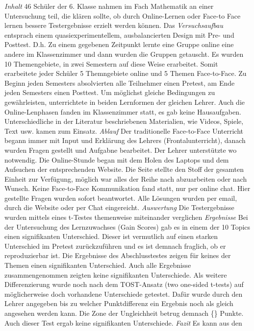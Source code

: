 \documentclass[12pt, bibliography=totoc]{scrartcl}
\begin{document}
\emph{Inhalt} 46 Schüler der 6. Klasse nahmen im Fach Mathematik an
einer Untersuchung teil, die klären sollte, ob durch Online-Lernen oder
Face-to Face lernen bessere Testergebnisse erzielt werden können. Das
\emph{Versuchsaufbau} entsprach einem quasiexperimentellem,
ausbalancierten Design mit Pre- und Posttest. D.h. Zu einem gegebenen
Zeitpunkt lernte eine Gruppe online eine andere im Klassenzimmer und
dann wurden die Gruppen getauscht. Es wurden 10 Themengebiete, in zwei
Semestern auf diese Weise erarbeitet. Somit erarbeitete jeder Schüler 5
Themngebiete online und 5 Themen Face-to-Face. Zu Beginn jeden Semesters
absolvierten alle Teilnehmer einen Pretest, am Ende jeden Semesters
einen Posttest. Um möglichst gleiche Bedingungen zu gewährleisten,
unterrichtete in beiden Lernformen der gleichen Lehrer. Auch die
Online-Lenphasen fanden im Klassenzimmer statt, es gab keine
Hausaufgaben. Unterschiedliche in der Literatur beschriebenen
Materialien, wie Videos, Spiele, Text usw. kamen zum Einsatz.
\emph{Ablauf} Der traditionelle Face-to-Face Unterricht begann immer mit
Input und Erklärung des Lehrers (Frontalunterricht), danach wurden
Fragen gestellt und Aufgabne bearbeitet. Der Lehrer unterstützte wo
notwendig. Die Online-Stunde began mit dem Holen des Laptops und dem
Aufsuchen der entsprechenden Website. Die Seite stellte den Stoff der
gesamten Einheit zur Verfügung, möglich war alles der Reihe nach
abzuarbeiten oder nach Wunsch. Keine Face-to-Face Kommunikation fand
statt, nur per online chat. Hier gestellte Fragen wurden sofort
beantwortet. Alle Lösungen wurden per email, durch die Website oder per
Chat eingereicht. \emph{Auswertung} Die Testergebnisse wurden mittels
eines t-Testes themenweise miteinander verglichen \emph{Ergebnisse} Bei
der Untersuchung des Lernzuwachses (Gain Scores) gab es in einem der 10
Topics einen signifikanten Unterschied. Dieser ist vermutlich auf einen
starken Unterschied im Pretest zurückzuführen und es ist demnach
fraglich, ob er reproduzierbar ist. Die Ergebnisse des Abschlusstestes
zeigen für keines der Themen einen signifikanten Unterschied. Auch alle
Ergebnisse zusammengenommen zeigten keine signifikanten Unterschiede.
Als weitere Differenzierung wurde noch nach dem TOST-Ansatz (two
one-sided t-tests) auf möglicherweise doch vorhandene Unterschiede
getestet. Dafür wurde durch den Lehrer angegeben bis zu welcher
Punktdifferenz ein Ergebnis noch als gleich angesehen werden kann. Die
Zone der Ungleichheit betrug demnach \{\} Punkte. Auch dieser Test
ergab keine signifikanten Unterschiede. \emph{Fazit} Es kann aus den
\end{document}
